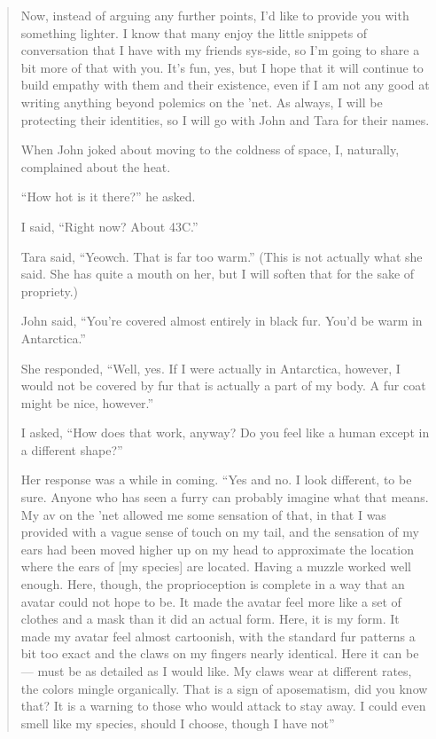 \begin{quote}
Now, instead of arguing any further points, I'd like to provide you with something lighter. I know that many enjoy the little snippets of conversation that I have with my friends sys-side, so I'm going to share a bit more of that with you. It's fun, yes, but I hope that it will continue to build empathy with them and their existence, even if I am not any good at writing anything beyond polemics on the 'net. As always, I will be protecting their identities, so I will go with John and Tara for their names.

When John joked about moving to the coldness of space, I, naturally, complained about the heat.

``How hot is it there?'' he asked.

I said, ``Right now? About 43C.''

Tara said, ``Yeowch. That is far too warm.'' (This is not actually what she said. She has quite a mouth on her, but I will soften that for the sake of propriety.)

John said, ``You're covered almost entirely in black fur. You'd be warm in Antarctica.''

She responded, ``Well, yes. If I were actually in Antarctica, however, I would not be covered by fur that is actually a part of my body. A fur coat might be nice, however.''

I asked, ``How does that work, anyway? Do you feel like a human except in a different shape?''

Her response was a while in coming. ``Yes and no. I look different, to be sure. Anyone who has seen a furry can probably imagine what that means. My av on the 'net allowed me some sensation of that, in that I was provided with a vague sense of touch on my tail, and the sensation of my ears had been moved higher up on my head to approximate the location where the ears of {[}my species{]} are located. Having a muzzle worked well enough. Here, though, the proprioception is complete in a way that an avatar could not hope to be. It made the avatar feel more like a set of clothes and a mask than it did an actual form. Here, it is my form. It made my avatar feel almost cartoonish, with the standard fur patterns a bit too exact and the claws on my fingers nearly identical. Here it can be — must be as detailed as I would like. My claws wear at different rates, the colors mingle organically. That is a sign of aposematism, did you know that? It is a warning to those who would attack to stay away. I could even smell like my species, should I choose, though I have not''


\end{quote}
